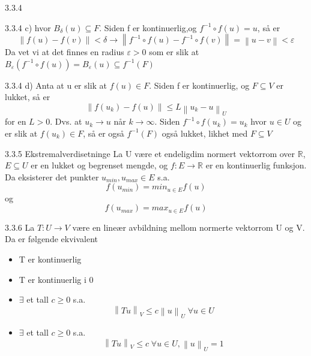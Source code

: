 \documentclass[a4paper,norsk]{article}
\renewcommand{\geq}{\geqslant}
\renewcommand{\leq}{\leqslant}
\renewcommand{\epsilon}{\varepsilon}
\begin{document}
\begin{oppgavebox}{3.3.4}{}
\begin{proofbox}{3.3.4 c)}{}
hvor $ B_{\delta} (u) \subseteq F $. Siden f er kontinuerlig,og $ f^{-1} \circ f(u) = u $, så er
\[
    \left\lVert f(u) - f(v) \right\rVert < \delta \rightarrow \left\lVert f^{-1} \circ f(u) - f^{-1} \circ f(v) \right\rVert = \left\lVert u - v \right\rVert < \epsilon 
\]
Da vet vi at det finnes en radius $ \epsilon > 0 $ som er slik at $ B_{\epsilon } \left( f^{-1} \circ f(u) \right) = B_{\epsilon } \left( u \right)  \subseteq f^{-1} (F) $ 
\end{proofbox}


\begin{proofbox}{3.3.4 d)}{}
Anta at u er slik at $ f(u) \in F $. Siden f er kontinuerlig, og $ F \subseteq V $ er lukket, så er 
\[
    \left\lVert f(u_k) - f(u) \right\rVert \leq L \left\lVert u_k - u \right\rVert_U
\]
for en $ L > 0 $. Dvs. at $ u_k \to u $ når $ k \to \infty $. Siden $ f^{-1} \circ f(u_k) = u_k $ hvor $ u \in U $ og er slik at $ f(u_k) \in F $, så er også $ f^{-1} \left( F \right)  $ også lukket, likhet med $ F \subseteq V $ 
\end{proofbox}
\end{oppgavebox}

\begin{theorembox}{3.3.5 Ekstremalverdisetninge}{}
La U være et endeligdim normert vektorrom over $ \mathbb{R} $, $ E \subseteq U $ er en lukket og begrenset mengde, og $ f: E \to \mathbb{R} $ er en kontinuerlig funksjon. Da eksisterer det punkter $ u_{min}, u_{max} \in E $ s.a.
\[
    f \left( u_{min} \right) = min_{u \in E} f(u)
\]
og \[
    f \left( u_{max} \right) = max_{u \in E} f(u)
\]
\end{theorembox}

\begin{theorembox}{3.3.6}{}
La $ T: U \to V $ være en lineær avbildning mellom normerte vektorrom U og V. Da er følgende ekvivalent
\begin{itemize}
    \item T er kontinuerlig
    \item T er kontinuerlig i 0
    \item $ \exists $ et tall $ c \geq 0 $ s.a.
    \[
        \left\lVert Tu \right\rVert_V \leq c \left\lVert u \right\rVert_U \; \forall u \in U
    \] 
    \item $ \exists $ et tall $ c \geq 0 $ s.a.
    \[
        \left\lVert Tu \right\rVert _V \leq c \; \forall u \in U, \left\lVert u \right\rVert _U = 1    
    \]
    
\end{itemize}
\end{theorembox}
\end{document}
